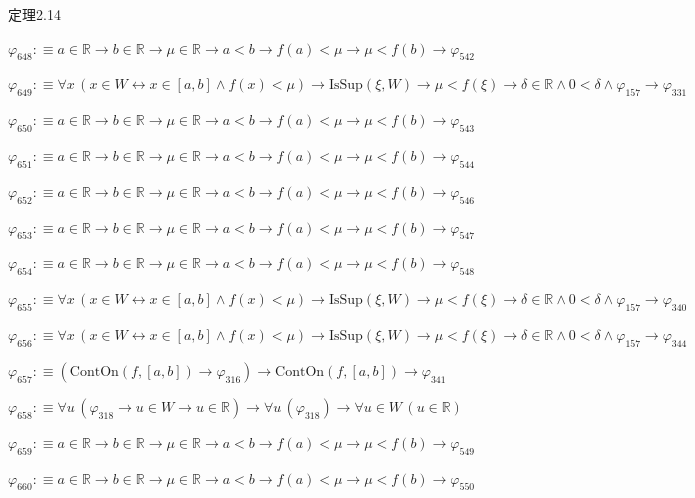 \begin{fullproof}{定理2.14}
\begin{abbrevlist}
\item $\varphi_{648} :\equiv a \in \mathbb{R} \to b \in \mathbb{R} \to \mu \in \mathbb{R} \to a < b \to f(a) < \mu \to \mu < f(b) \to \varphi_{542}$
\item $\varphi_{649} :\equiv \forall x\,(x \in W \leftrightarrow x \in [a,b] \land f(x) < \mu) \to \mathrm{IsSup}(\xi,W) \to \mu < f(\xi) \to \delta \in \mathbb{R} \land 0 < \delta \land \varphi_{157} \to \varphi_{331}$
\item $\varphi_{650} :\equiv a \in \mathbb{R} \to b \in \mathbb{R} \to \mu \in \mathbb{R} \to a < b \to f(a) < \mu \to \mu < f(b) \to \varphi_{543}$
\item $\varphi_{651} :\equiv a \in \mathbb{R} \to b \in \mathbb{R} \to \mu \in \mathbb{R} \to a < b \to f(a) < \mu \to \mu < f(b) \to \varphi_{544}$
\item $\varphi_{652} :\equiv a \in \mathbb{R} \to b \in \mathbb{R} \to \mu \in \mathbb{R} \to a < b \to f(a) < \mu \to \mu < f(b) \to \varphi_{546}$
\item $\varphi_{653} :\equiv a \in \mathbb{R} \to b \in \mathbb{R} \to \mu \in \mathbb{R} \to a < b \to f(a) < \mu \to \mu < f(b) \to \varphi_{547}$
\item $\varphi_{654} :\equiv a \in \mathbb{R} \to b \in \mathbb{R} \to \mu \in \mathbb{R} \to a < b \to f(a) < \mu \to \mu < f(b) \to \varphi_{548}$
\item $\varphi_{655} :\equiv \forall x\,(x \in W \leftrightarrow x \in [a,b] \land f(x) < \mu) \to \mathrm{IsSup}(\xi,W) \to \mu < f(\xi) \to \delta \in \mathbb{R} \land 0 < \delta \land \varphi_{157} \to \varphi_{340}$
\item $\varphi_{656} :\equiv \forall x\,(x \in W \leftrightarrow x \in [a,b] \land f(x) < \mu) \to \mathrm{IsSup}(\xi,W) \to \mu < f(\xi) \to \delta \in \mathbb{R} \land 0 < \delta \land \varphi_{157} \to \varphi_{344}$
\item $\varphi_{657} :\equiv (\mathrm{ContOn}(f,[a,b]) \to \varphi_{316}) \to \mathrm{ContOn}(f,[a,b]) \to \varphi_{341}$
\item $\varphi_{658} :\equiv \forall u\,(\varphi_{318} \to u \in W \to u \in \mathbb{R}) \to \forall u\,(\varphi_{318}) \to \forall u \in W\,(u \in \mathbb{R})$
\item $\varphi_{659} :\equiv a \in \mathbb{R} \to b \in \mathbb{R} \to \mu \in \mathbb{R} \to a < b \to f(a) < \mu \to \mu < f(b) \to \varphi_{549}$
\item $\varphi_{660} :\equiv a \in \mathbb{R} \to b \in \mathbb{R} \to \mu \in \mathbb{R} \to a < b \to f(a) < \mu \to \mu < f(b) \to \varphi_{550}$

\end{abbrevlist}
\end{fullproof}
